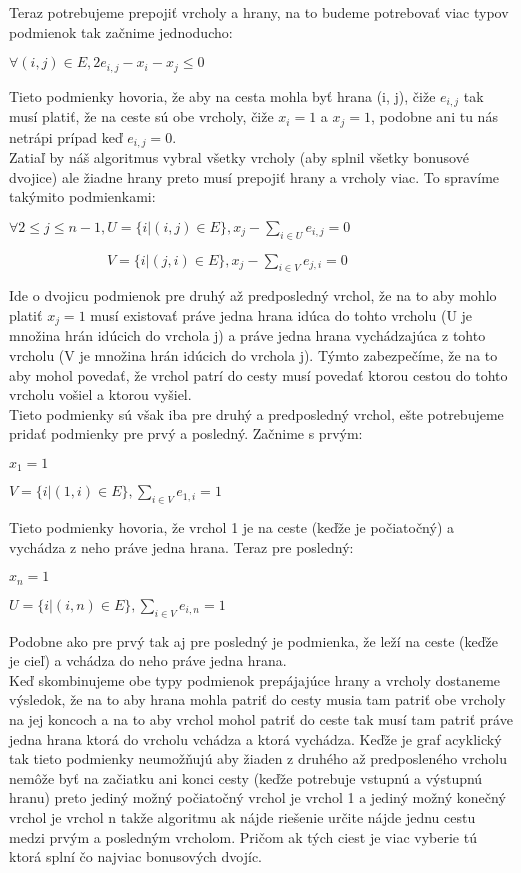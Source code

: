 \documentclass[a4paper]{article}
\begin{document}
Teraz potrebujeme prepojiť vrcholy a hrany, na to budeme potrebovať viac typov podmienok tak začnime jednoducho:

$\forall (i, j) \in E, 2 e_{i,j} - x_{i} - x_{j} \leq 0$

Tieto podmienky hovoria, že aby na cesta mohla byť hrana (i, j), čiže $e_{i,j}$ tak musí platiť, že na ceste sú obe vrcholy, čiže $x_{i} = 1$ a $x_{j} = 1$, podobne ani tu nás netrápi prípad keď $e_{i,j} = 0$.
\\

Zatiaľ by náš algoritmus vybral všetky vrcholy (aby splnil všetky bonusové dvojice) ale žiadne hrany preto musí prepojiť hrany a vrcholy viac. To spravíme takýmito podmienkami:

$\forall 2 \leq j \leq n-1, U = \{ i | (i, j) \in E \}, x_{j} - \sum_{i \in U}^{}e_{i,j} = 0$

$\quad \quad \quad \quad \quad \quad \quad V = \{ i | (j, i) \in E \}, x_{j} - \sum_{i \in V}^{}e_{j,i} = 0$

Ide o dvojicu podmienok pre druhý až predposledný vrchol, že na to aby mohlo platiť $x_{j} = 1$ musí existovať práve jedna hrana idúca do tohto vrcholu (U je množina hrán idúcich do vrchola j) a práve jedna hrana vychádzajúca z tohto vrcholu (V je množina hrán idúcich do vrchola j). Týmto zabezpečíme, že na to aby mohol povedať, že vrchol patrí do cesty musí povedať ktorou cestou do tohto vrcholu vošiel a ktorou vyšiel.
\\

Tieto podmienky sú však iba pre druhý a predposledný vrchol, ešte potrebujeme pridať podmienky pre prvý a posledný. 
Začnime s prvým:

$x_1 = 1$

$V = \{ i | (1, i) \in E \}, \sum_{i \in V}^{}e_{1,i} = 1$

Tieto podmienky hovoria, že vrchol 1 je na ceste (keďže je počiatočný) a vychádza z neho práve jedna hrana. Teraz pre posledný:

$x_n = 1$

$U = \{ i | (i, n) \in E \}, \sum_{i \in V}^{}e_{i,n} = 1$

Podobne ako pre prvý tak aj pre posledný je podmienka, že leží na ceste (keďže je cieľ) a vchádza do neho práve jedna hrana.
\\

Keď skombinujeme obe typy podmienok prepájajúce hrany a vrcholy dostaneme výsledok, že na to aby hrana mohla patriť do cesty musia tam patriť obe vrcholy na jej koncoch a na to aby vrchol mohol patriť do ceste tak musí tam patriť práve jedna hrana ktorá do vrcholu vchádza a ktorá vychádza. Keďže je graf acyklický tak tieto podmienky neumožňujú aby žiaden z druhého až predposleného vrcholu nemôže byť na začiatku ani konci cesty (keďže potrebuje vstupnú a výstupnú hranu) preto jediný možný počiatočný vrchol je vrchol 1 a jediný možný konečný vrchol je vrchol n takže algoritmu ak nájde riešenie určite nájde jednu cestu medzi prvým a posledným vrcholom. Pričom ak tých ciest je viac vyberie tú ktorá splní čo najviac bonusových dvojíc.
\\
\end{document}
